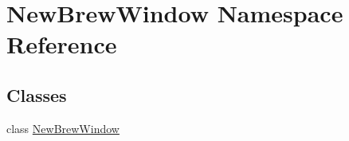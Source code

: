 \hypertarget{namespace_new_brew_window}{}\section{New\+Brew\+Window Namespace Reference}
\label{namespace_new_brew_window}
\subsection*{Classes}
\begin{DoxyCompactItemize}
\item 
class \mbox{\hyperlink{class_new_brew_window_1_1_new_brew_window}{New\+Brew\+Window}}
\end{DoxyCompactItemize}
